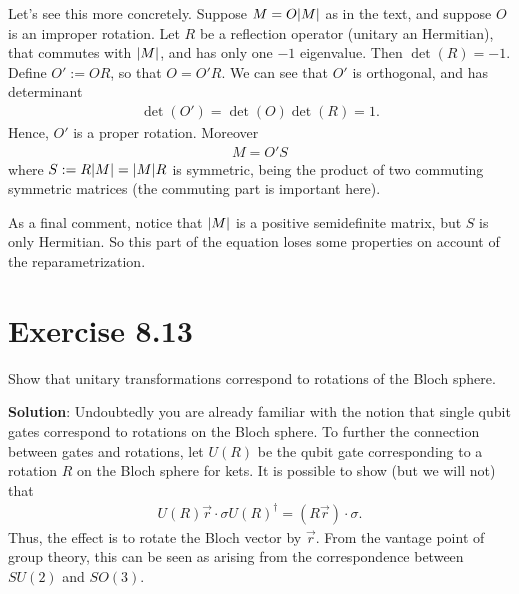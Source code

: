 \documentclass{book}
\begin{document}
    Let's see this more concretely. Suppose $M = O \abs{M}$ as in the text, and suppose $O$ is an improper rotation. Let $R$ be a reflection operator (unitary an Hermitian), that commutes with $\abs{M}$, and has only one $-1$ eigenvalue. Then $\det(R) = -1$. Define $O' := O R$, so that $O = O' R$. We can see that $O'$ is orthogonal, and has determinant
    \begin{align}
        \det(O') = \det(O)\det(R) = 1.
    \end{align}
    Hence, $O'$ is a proper rotation. Moreover
    \begin{align}
        M = O' S
    \end{align}
    where $S := R \abs{M} = \abs{M} R$ is symmetric, being the product of two commuting symmetric matrices (the commuting part is important here). 

    As a final comment, notice that $\abs{M}$ is a positive semidefinite matrix, but $S$ is only Hermitian. So this part of the equation loses some properties on account of the reparametrization. 

\section*{Exercise 8.13}
    Show that unitary transformations correspond to rotations of the Bloch sphere. 

    \textbf{Solution}: Undoubtedly you are already familiar with the notion that single qubit gates correspond to rotations on the Bloch sphere. To further the connection between gates and rotations, let $U(R)$ be the qubit gate corresponding to a rotation $R$ on the Bloch sphere for kets. It is possible to show (but we will not) that
    \begin{align}
        U(R) \vec{r}\cdot \sigma U(R)^\dagger = (R \vec{r}) \cdot \sigma.
    \end{align}
    Thus, the effect is to rotate the Bloch vector by $\vec{r}$. From the vantage point of group theory, this can be seen as arising from the correspondence between $SU(2)$ and $SO(3)$.
\end{document}
